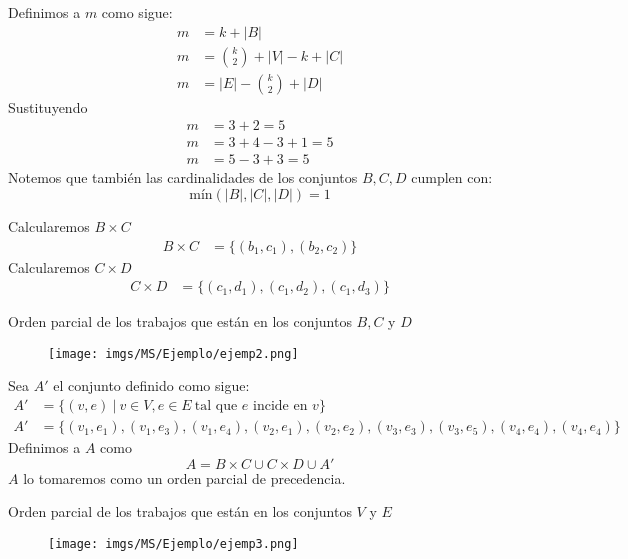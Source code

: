 \documentclass[spanish, xcolor=dvipsnames, aspectratio=169]{beamer}
\newcommand{\subsectiontitle}{}
\begin{document}
\begin{frame}{\subsectiontitle}
Definimos a \(m\) como sigue:
\begin{align*}
    m &= k + |B| \\
    m &= \binom{k}{2} + |V| - k + |C| \\
    m &= |E| - \binom{k}{2} + |D|
\end{align*}
Sustituyendo
\begin{align*}
    m &= 3 + 2 = 5 \\
    m &= 3 + 4 - 3 + 1 = 5 \\
    m &= 5 - 3 + 3 = 5
\end{align*} 
Notemos que también las cardinalidades de los conjuntos \(B, C, D\) cumplen con:
\[
    \text{mín}\left(|B|, |C|, |D|\right) = 1
\]
\end{frame}
\begin{frame}{\subsectiontitle}
Calcularemos \(B \times C\)
\begin{align*}
    B \times C &= \{(b_{1}, c_{1}), (b_{2}, c_{2})\}
\end{align*}
Calcularemos \(C \times D\)
\begin{align*}
    C \times D &= \{(c_{1}, d_{1}), (c_{1}, d_{2}), (c_{1}, d_{3})\}
\end{align*}
\end{frame}
\begin{frame}{\subsectiontitle}
Orden parcial de los trabajos que están en los conjuntos \(B, C\) y \(D\)
    \begin{figure}
    \centering
    \texttt{[image: imgs/MS/Ejemplo/ejemp2.png]}
    \label{fig:my_label}
\end{figure}
\end{frame}
\begin{frame}{\subsectiontitle}
Sea \(A'\) el conjunto definido como sigue:
\begin{align*}
    A' &= \{(v, e) \ | \ v \in V, e \in E \ \text{tal que \(e\) incide en \(v\)}\} \\
    A' &= \{(v_{1}, e_{1}), (v_{1}, e_{3}), (v_{1}, e_{4}), (v_{2}, e_{1}), (v_{2}, e_{2}), (v_{3}, e_{3}), (v_{3}, e_{5}), (v_{4}, e_{4}), (v_{4}, e_{4}) \}
\end{align*}
Definimos a \(A\) como 
\[
    A = B \times C \cup C \times D \cup A'
\]
\(A\) lo tomaremos como un orden parcial de precedencia.
\newline 
\end{frame}
\begin{frame}{\subsectiontitle}
Orden parcial de los trabajos que están en los conjuntos \(V\) y \(E\)
    \begin{figure}
        \centering
        \texttt{[image: imgs/MS/Ejemplo/ejemp3.png]}
    \end{figure}
\end{frame}
\end{document}
